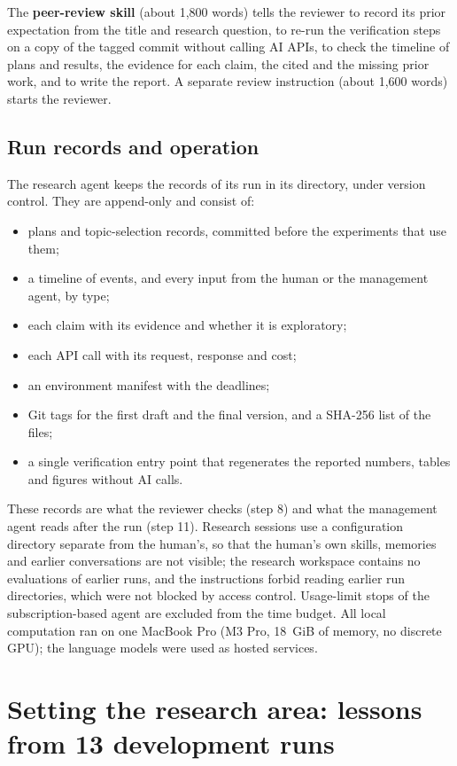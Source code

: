 \documentclass[11pt]{article}
\begin{document}
The \textbf{peer-review skill} (about 1,800 words) tells the reviewer to record its prior expectation from the title and research question, to re-run the verification steps on a copy of the tagged commit without calling AI APIs, to check the timeline of plans and results, the evidence for each claim, the cited and the missing prior work, and to write the report. A separate review instruction (about 1,600 words) starts the reviewer.

\subsection{Run records and operation}
The research agent keeps the records of its run in its directory, under version control. They are append-only and consist of:
\begin{itemize}[leftmargin=*,itemsep=0pt]
  \item plans and topic-selection records, committed before the experiments that use them;
  \item a timeline of events, and every input from the human or the management agent, by type;
  \item each claim with its evidence and whether it is exploratory;
  \item each API call with its request, response and cost;
  \item an environment manifest with the deadlines;
  \item Git tags for the first draft and the final version, and a SHA-256 list of the files;
  \item a single verification entry point that regenerates the reported numbers, tables and figures without AI calls.
\end{itemize}
These records are what the reviewer checks (step 8) and what the management agent reads after the run (step 11). Research sessions use a configuration directory separate from the human's, so that the human's own skills, memories and earlier conversations are not visible; the research workspace contains no evaluations of earlier runs, and the instructions forbid reading earlier run directories, which were not blocked by access control. Usage-limit stops of the subscription-based agent are excluded from the time budget. All local computation ran on one MacBook Pro (M3 Pro, 18~GiB of memory, no discrete GPU); the language models were used as hosted services.

\section{Setting the research area: lessons from 13 development runs}
\label{sec:area}
\end{document}
